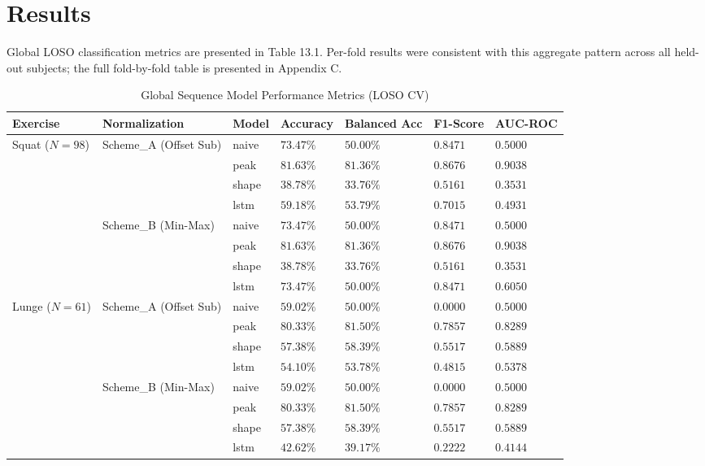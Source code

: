 \section{Results}
\label{sec:13-3-results}


Global LOSO classification metrics are presented in Table 13.1. Per-fold results were consistent with this aggregate pattern across all held-out subjects; the full fold-by-fold table is presented in Appendix C.


\begin{table}[htbp]
\centering
\scriptsize
\setlength{\tabcolsep}{3pt}
\renewcommand{\arraystretch}{1.2}
\caption{Global Sequence Model Performance Metrics (LOSO CV)}
\label{tab:table-13-1-global-sequence-model-performance-metrics-loso-cv}
\begin{tabular}{@{}p{1.4cm} p{2.7cm} >{\centering\arraybackslash}p{1.4cm} >{\centering\arraybackslash}p{1.8cm} >{\centering\arraybackslash}p{2.0cm} >{\centering\arraybackslash}p{1.6cm} >{\centering\arraybackslash}p{1.6cm}@{}}
\hline
\textbf{Exercise} & \textbf{Normalization} & \textbf{Model} & \textbf{Accuracy} & \textbf{Balanced Acc} & \textbf{F1-Score} & \textbf{AUC-ROC} \\
\hline
Squat ($N=98$) & Scheme\_A (Offset Sub) & naive & $73.47\%$ & $50.00\%$ & $0.8471$ & $0.5000$ \\
 &  & peak & $81.63\%$ & $81.36\%$ & $0.8676$ & $0.9038$ \\
 &  & shape & $38.78\%$ & $33.76\%$ & $0.5161$ & $0.3531$ \\
 &  & lstm & $59.18\%$ & $53.79\%$ & $0.7015$ & $0.4931$ \\
 & Scheme\_B (Min-Max) & naive & $73.47\%$ & $50.00\%$ & $0.8471$ & $0.5000$ \\
 &  & peak & $81.63\%$ & $81.36\%$ & $0.8676$ & $0.9038$ \\
 &  & shape & $38.78\%$ & $33.76\%$ & $0.5161$ & $0.3531$ \\
 &  & lstm & $73.47\%$ & $50.00\%$ & $0.8471$ & $0.6050$ \\
Lunge ($N=61$) & Scheme\_A (Offset Sub) & naive & $59.02\%$ & $50.00\%$ & $0.0000$ & $0.5000$ \\
 &  & peak & $80.33\%$ & $81.50\%$ & $0.7857$ & $0.8289$ \\
 &  & shape & $57.38\%$ & $58.39\%$ & $0.5517$ & $0.5889$ \\
 &  & lstm & $54.10\%$ & $53.78\%$ & $0.4815$ & $0.5378$ \\
 & Scheme\_B (Min-Max) & naive & $59.02\%$ & $50.00\%$ & $0.0000$ & $0.5000$ \\
 &  & peak & $80.33\%$ & $81.50\%$ & $0.7857$ & $0.8289$ \\
 &  & shape & $57.38\%$ & $58.39\%$ & $0.5517$ & $0.5889$ \\
 &  & lstm & $42.62\%$ & $39.17\%$ & $0.2222$ & $0.4144$ \\
\hline
\end{tabular}
\end{table}

